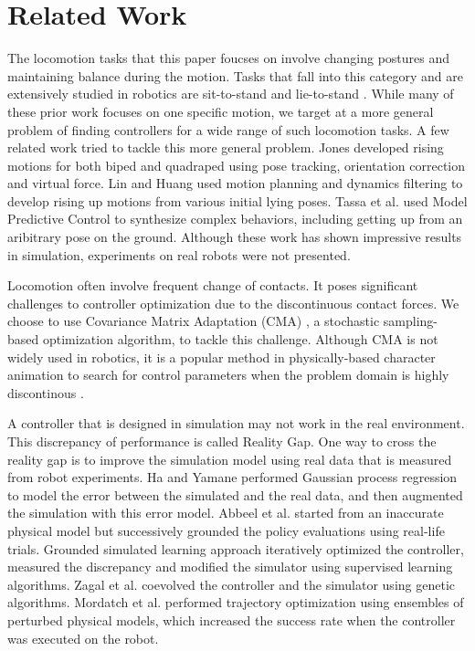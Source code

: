\section{Related Work}
The locomotion tasks that this paper foucses on involve changing postures and maintaining balance during the motion. Tasks that fall into this category and are extensively studied in robotics are sit-to-stand \cite{Faloutsos:2003,Iida:2004,Pchelkin:2010,Mistry:2010} and lie-to-stand \cite{morimoto:1998,Faloutsos:2001,Hirukawa:2005,Kanehiro:2007}. While many of these prior work focuses on one specific motion, we target at a more general problem of finding controllers for a wide range of such locomotion tasks. A few related work tried to tackle this more general problem. Jones \cite{jones:2011} developed rising motions for both biped and quadraped using pose tracking, orientation correction and virtual force. Lin and Huang \cite{lin:2012} used motion planning and dynamics filtering to develop rising up motions from various initial lying poses. Tassa et al. \cite{tassa:2012} used Model Predictive Control to synthesize complex behaviors, including getting up from an aribitrary pose on the ground. Although these work has shown impressive results in simulation, experiments on real robots were not presented.

Locomotion often involve frequent change of contacts. It poses significant challenges to controller optimization due to the discontinuous contact forces. We choose to use Covariance Matrix Adaptation (CMA) \cite{Hansen:2009}, a stochastic sampling-based optimization algorithm, to tackle this challenge. Although CMA is not widely used in robotics, it is a popular method in physically-based character animation to search for control parameters when the problem domain is highly discontinous \cite{Wu:2010, Wang:2010, Tan:2014}.

A controller that is designed in simulation may not work in the real environment. This discrepancy of performance is called Reality Gap. One way to cross the reality gap is to improve the simulation model using real data that is measured from robot experiments. Ha and Yamane \cite{HA:2015} performed Gaussian process regression to model the error between the simulated and the real data, and then augmented the simulation with this error model. Abbeel et al. \cite{Abbeel:2006} started from an inaccurate physical model but successively grounded the policy evaluations using real-life trials. Grounded simulated learning approach \cite{Farchy:2013} iteratively optimized the controller, measured the discrepancy and modified the simulator using supervised learning algorithms. Zagal et al. \cite{zagal2004} coevolved the controller and the simulator using genetic algorithms. Mordatch et al. \cite{Mordatch:2015} performed trajectory optimization using ensembles of perturbed physical models, which increased the success rate when the controller was executed on the robot.

